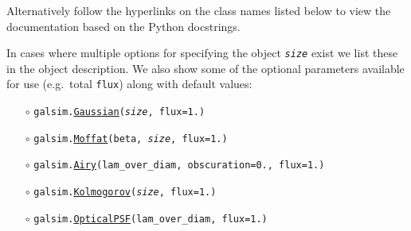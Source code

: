 \documentclass[preprint,10pt]{../../devel/modules/aastex}
\begin{document}
Alternatively follow the hyperlinks on
the class names listed below to view the documentation based
on the Python docstrings.

In cases where multiple options for specifying the object \emph{\texttt{size}}
exist we list these in the object description. We also show some of the optional
parameters available for use (e.g.\ total \texttt{flux}) along with default values:
\begin{itemize}
\item[$\circ$]
  \texttt{galsim.}\href{http://galsim-developers.github.io/GalSim/classgalsim_1_1base_1_1_gaussian.html}{\texttt{Gaussian}}\texttt{(\emph{size}, flux=1.)}
\item[$\circ$]
  \texttt{galsim.}\href{http://galsim-developers.github.com/GalSim/classgalsim_1_1base_1_1_moffat.html}{\texttt{Moffat}}\texttt{(beta, \emph{size}, flux=1.)}
\item[$\circ$]
  \texttt{galsim.}\href{http://galsim-developers.github.com/GalSim/classgalsim_1_1base_1_1_airy.html}{\texttt{Airy}}\texttt{(lam\_over\_diam, obscuration=0., flux=1.)}
\item[$\circ$]
  \texttt{galsim.}\href{http://galsim-developers.github.com/GalSim/classgalsim_1_1base_1_1_kolmogorov.html}{\texttt{Kolmogorov}}\texttt{(\emph{size}, flux=1.)}
\item[$\circ$]
  \texttt{galsim.}\href{http://galsim-developers.github.io/GalSim/classgalsim_1_1optics_1_1_optical_p_s_f.html}{\texttt{OpticalPSF}}\texttt{(lam\_over\_diam, flux=1.)}

\end{itemize}
\end{document}
